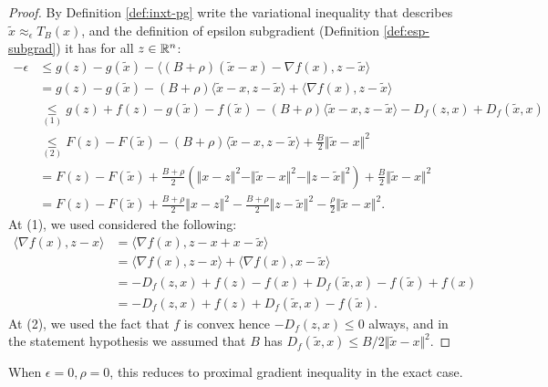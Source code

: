 \documentclass[12pt]{article}
\begin{document}
        \begin{proof}
            By Definition \ref{def:inxt-pg} write the variational inequality that describes $\tilde x \approx_\epsilon T_B(x)$, and the definition of epsilon subgradient (Definition \ref{def:esp-subgrad}) it has for all $z \in \mathbb R^n$: 
            \begin{align*}
                - \epsilon &\le 
                g(z) - g(\tilde x) - \langle (B + \rho)(\tilde x - x) - \nabla f(x), z - \tilde x\rangle
                \\
                &= 
                g(z) - g(\tilde x) 
                - (B + \rho)\langle \tilde x - x, z - \tilde x\rangle
                + \langle \nabla f(x), z - \tilde x\rangle
                \\
                &\underset{(1)}{\le} 
                g(z) + f(z) - g(\tilde x) - f(\tilde x)
                - (B + \rho)\langle \tilde x - x, z - \tilde x\rangle
                - D_f(z, x) + D_f(\tilde x, x)
                \\
                &\underset{(2)}{\le} 
                F(z) - F(\tilde x)
                - (B + \rho)\langle \tilde x - x, z - \tilde x\rangle
                + \frac{B}{2}\Vert \tilde x - x\Vert^2
                \\
                &=
                F(z) - F(\tilde x) + \frac{B + \rho}{2}\left(
                    \Vert x - z\Vert^2
                    - \Vert \tilde x - x\Vert^2
                    - \Vert z - \tilde x\Vert^2
                \right)
                + \frac{B}{2}\Vert \tilde x - x\Vert^2
                \\
                &= 
                F(z) - F(\tilde x)
                + \frac{B + \rho}{2}\Vert x - z\Vert^2
                - \frac{B + \rho}{2}\Vert z - \tilde x\Vert^2
                - \frac{\rho}{2}\Vert \tilde x - x\Vert^2. 
            \end{align*}
            At (1), we used considered the following: 
            \begin{align*}
                \langle \nabla f(x), z - x\rangle &= \langle \nabla f(x), z - x + x - \tilde x\rangle
                \\
                &= \langle \nabla f(x), z - x\rangle + \langle \nabla f(x), x - \tilde x\rangle
                \\
                &= -D_f(z, x) + f(z) - f(x) + D_f(\tilde x, x) - f(\tilde x) + f(x)
                \\
                &= -D_f(z, x) + f(z) + D_f(\tilde x, x) - f(\tilde x). 
            \end{align*}
            At (2), we used the fact that $f$ is convex hence $- D_f(z, x) \le 0$ always, and in the statement hypothesis we assumed that $B$ has $D_f(\tilde x, x) \le B/2\Vert \tilde x - x\Vert^2$. 
        \end{proof}
        \begin{remark}
            When $\epsilon = 0, \rho = 0$, this reduces to proximal gradient inequality in the exact case. 
        \end{remark}
\end{document}
